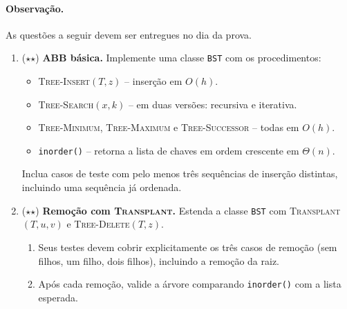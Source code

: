 \documentclass[10pt,a4paper]{extarticle}
\newcommand{\impt}[1]{\textcolor{important}{#1}}
\newcommand{\ntc}[1]{\textcolor{notice}{#1}}
\begin{document}
\paragraph{Observação.} As questões a seguir devem ser entregues no dia da prova.

\begin{enumerate}[label=\textbf{\arabic*.}, leftmargin=*, start=17]

\item \ntc{($\star$$\star$)} \textbf{ABB básica.} Implemente uma classe \texttt{BST} com os procedimentos:
  \begin{itemize}
    \item \textsc{Tree-Insert}$(T, z)$ -- inserção em $O(h)$.
    \item \textsc{Tree-Search}$(x, k)$ -- em duas versões: \impt{recursiva} e \impt{iterativa}.
    \item \textsc{Tree-Minimum}, \textsc{Tree-Maximum} e \textsc{Tree-Successor} -- todas em $O(h)$.
    \item \texttt{inorder()} -- retorna a lista de chaves em ordem crescente em $\Theta(n)$.
  \end{itemize}
Inclua casos de teste com pelo menos três sequências de inserção distintas, incluindo uma sequência \impt{já ordenada}.

\item \ntc{($\star$$\star$)} \textbf{Remoção com \textsc{Transplant}.} Estenda a classe \texttt{BST} com \textsc{Transplant}$(T, u, v)$ e \textsc{Tree-Delete}$(T, z)$.
  \begin{enumerate}[label=(\alph*)]
    \item Seus testes devem cobrir explicitamente os \impt{três casos} de remoção (sem filhos, um filho, dois filhos), incluindo a remoção da raiz.
    \item Após cada remoção, valide a árvore comparando \texttt{inorder()} com a lista esperada.
  \end{enumerate}

\end{enumerate}


\end{document}
